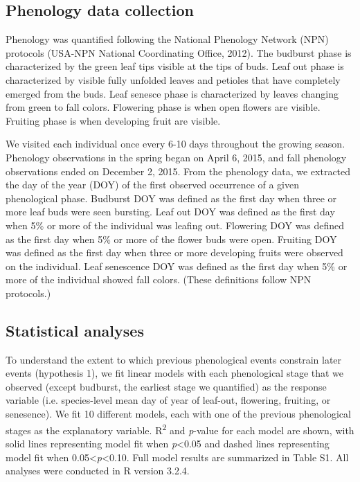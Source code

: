 \documentclass{article}
\begin{document}
\subsection*{Phenology data collection}
Phenology was quantified following the National Phenology Network (NPN) protocols (USA-NPN National Coordinating Office, 2012). The budburst phase is characterized by the green leaf tips visible at the tips of buds. Leaf out phase is characterized by visible fully unfolded leaves and petioles that have completely emerged from the buds. Leaf senesce phase is characterized by leaves changing from green to fall colors. Flowering phase is when open flowers are visible. Fruiting phase is when developing fruit are visible. 
\par We visited each individual once every 6-10 days throughout the growing season. Phenology observations in the spring began on April 6, 2015, and fall phenology observations ended on December 2, 2015.
From the phenology data, we extracted the day of the year (DOY) of the first observed occurrence of a given phenological phase. Budburst DOY was defined as the first day when three or more leaf buds were seen bursting. Leaf out DOY was defined as the first day when 5\% or more of the individual was leafing out. Flowering DOY was defined as the first day when 5\% or more of the flower buds were open. Fruiting DOY was defined as the first day when three or more developing fruits were observed on the individual. Leaf senescence DOY was defined as the first day when 5\% or more of the individual showed fall colors. (These definitions follow NPN protocols.)
\subsection*{Statistical analyses}
To understand the extent to which previous phenological events constrain later events (hypothesis 1), we fit linear models with each phenological stage that we observed (except budburst, the earliest stage we quantified) as the response variable (i.e. species-level mean day of year of leaf-out, flowering, fruiting, or senesence).  We fit 10 different models, each with one of the previous phenological stages as the explanatory variable. R\textsuperscript{2} and \textit{p}-value for each model are shown, with solid lines representing model fit when \textit{p}<0.05 and dashed lines representing model fit when 0.05<\textit{p}<0.10. Full model results are summarized in Table S1. All analyses were conducted in R version 3.2.4.
\end{document}
